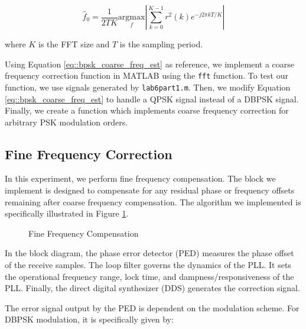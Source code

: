 \documentclass{article}
\begin{document}
\begin{equation}
	\label{eq::bpsk_coarse_freq_est}	
	\hat{f}_0 = \frac{1}{2TK}\underset{f}{\text{argmax}}\left\vert\sum_{k=0}^{K-1}{r^2(k)e^{-j2{\pi}kT/K}}\right\vert
\end{equation}

\noindent where $K$ is the FFT size and $T$ is the sampling period.

Using Equation \ref{eq::bpsk_coarse_freq_est} as reference, we implement a coarse frequency correction function in MATLAB using the \texttt{fft} function. To test our function, we use signals generated by \texttt{lab6part1.m}. Then, we modify Equation \ref{eq::bpsk_coarse_freq_est} to handle a QPSK signal instead of a DBPSK signal. Finally, we create a function which implements coarse frequency correction for arbitrary PSK modulation orders.

\subsection{Fine Frequency Correction}

In this experiment, we perform fine frequency compensation. The block we implement is designed to compensate for any residual phase or frequency offsets remaining after coarse frequency compensation. The algorithm we implemented is specifically illustrated in Figure \ref{fig::fine_freq_comp_block_diagram}.

\begin{figure}[H]
	\centerline{}
	\caption{Fine Frequency Compensation}
	\label{fig::fine_freq_comp_block_diagram}
\end{figure}

In the block diagram, the phase error detector (PED) measures the phase offset of the receive samples. The loop filter governs the dynamics of the PLL. It sets the operational frequency range, lock time, and dampness/responsiveness of the PLL. Finally, the direct digital synthesizer (DDS) generates the correction signal.

The error signal output by the PED is dependent on the modulation scheme. For DBPSK modulation, it is specifically given by:
\end{document}
